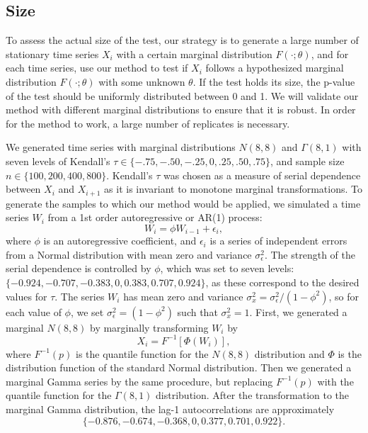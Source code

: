 \documentclass[12pt]{article}
\begin{document}
\subsection{Size}
To assess the actual size of the test, our strategy is to
generate a large number of stationary time series $X_i$ with a certain marginal
distribution $F(\cdot; \theta)$, and for each time series, use our method to
test if $X_i$ follows a hypothesized marginal distribution $F(\cdot; \theta)$
with some unknown $\theta$. If the test holds its size, the p-value
of the test should be uniformly distributed between 0 and 1. We will validate
our method with different marginal distributions to ensure that it is robust.
In order for the method to work, a large number of replicates is necessary.


We generated time series with marginal distributions $N(8, 8)$ and
$\Gamma(8, 1)$ with seven levels of Kendall's
$\tau \in \{-.75, -.50, -.25, 0, .25, .50, .75\}$, and
sample size $n \in \{100, 200, 400, 800\}$. Kendall's $\tau$ was chosen as a
measure of serial dependence between $X_i$ and
$X_{i+1}$ as it is invariant to monotone marginal
transformations.
To generate the samples to which our
method would be applied, we simulated a time series $W_i$ from a 1st
order autoregressive or AR(1) process:
\begin{equation*}
W_i = \phi W_{i-1} + \epsilon_i,
\end{equation*}
where $\phi$ is an autoregressive coefficient, and $\epsilon_i$ is a series of
independent errors from a Normal distribution with mean zero and variance
$\sigma_{\epsilon}^2$. The strength of the serial dependence is controlled by
$\phi$, which was set to seven levels:
$\{-0.924, -0.707, -0.383, 0, 0.383, 0.707, 0.924\}$, as these
correspond to the desired values for $\tau$. The
series $W_i$ has mean zero and variance
$\sigma_x^2 = \sigma_{\epsilon}^2 / (1 - \phi^2)$, so for each value of
$\phi$,  we
set $\sigma_{\epsilon}^2 = (1 - \phi^2)$ such that $\sigma_x^2 = 1$.
First, we generated a
marginal $N(8, 8)$ by marginally transforming $W_i$ by
\begin{equation*}
X_i = F^{-1}[\Phi(W_i)],
\end{equation*}
where $F^{-1}(p)$ is the quantile function for the $N(8, 8)$
distribution and $\Phi$ is the distribution function of the standard Normal
distribution.
Then we generated a marginal Gamma series by the same procedure, but
replacing $F^{-1}(p)$ with the quantile function for the $\Gamma(8, 1)$
distribution. After the transformation
to the marginal Gamma distribution, the lag-1 autocorrelations are approximately
\[
  \{-0.876, -0.674, -0.368, 0, 0.377, 0.701, 0.922\}.
\]
\end{document}
